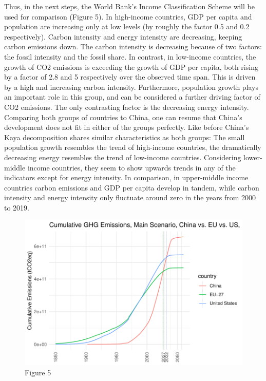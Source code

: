 \documentclass[
  12pt,
]{article}
\numberwithin{equation}{section}
\numberwithin{table}{section}
\numberwithin{figure}{section}
\begin{document}
Thus, in the next steps, the World Bank's Income Classification Scheme
will be used for comparison (Figure 5). In high-income countries, GDP
per capita and population are increasing only at low levels (by roughly
the factor 0.5 and 0.2 respectively). Carbon intensity and energy
intensity are decreasing, keeping carbon emissions down. The carbon
intensity is decreasing because of two factors: the fossil intensity and
the fossil share. In contrast, in low-income countries, the growth of
CO2 emissions is exceeding the growth of GDP per capita, both rising by
a factor of 2.8 and 5 respectively over the observed time span. This is
driven by a high and increasing carbon intensity. Furthermore,
population growth plays an important role in this group, and can be
considered a further driving factor of CO2 emissions. The only
contrasting factor is the decreasing energy intensity. Comparing both
groups of countries to China, one can resume that China's development
does not fit in either of the groups perfectly. Like before China's Kaya
decomposition shares similar characteristics as both groups: The small
population growth resembles the trend of high-income countries, the
dramatically decreasing energy resembles the trend of low-income
countries. Considering lower-middle income countries, they seem to show
upwards trends in any of the indicators except for energy intensity. In
comparison, in upper-middle income countries carbon emissions and GDP
per capita develop in tandem, while carbon intensity and energy
intensity only fluctuate around zero in the years from 2000 to 2019.

\begin{figure}
\centering
\includegraphics{Paper_files/figure-latex/unnamed-chunk-5-1.pdf}
\caption{Figure 5}
\end{figure}
\end{document}
